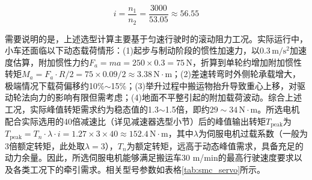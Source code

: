 {{{        \begin{equation}
        i = \frac{n_1}{n_2} = \frac{3000}{53.05} \approx 56.55
        \label{eq:4-2-8}
        \end{equation}

        需要说明的是，上述选型计算主要基于匀速行驶时的滚动阻力工况。实际运行中，小车还面临以下动态载荷情形：(1)起步与制动阶段的惯性加速力，以$0.3\,\mathrm{m/s^2}$加速度估算，附加惯性力约$F_a = ma = 250 \times 0.3 = 75\,\mathrm{N}$，折算到单轮约增加附加惯性转矩$M_a = F_a \cdot R / 2 = 75 \times 0.09 / 2 \approx 3.38 \, \mathrm{N\cdot m}$；(2)差速转弯时外侧轮承载增大，极端情况下载荷偏移约10\%$\sim$15\%；(3)举升过程中搬运物抬升导致重心上移，对驱动轮法向力的影响有限但需考虑；(4)地面不平整引起的附加载荷波动。综合上述工况，实际峰值转矩需求约为稳态值的1.3$\sim$1.5倍，即约$29\sim34\,\mathrm{N\cdot m}$。所选电机配合实际选用的40倍减速比（详见减速器选型小节）后的峰值输出转矩$T_{\text{peak}}$为$T_{\text{peak}} = T_n \cdot \lambda \cdot i = 1.27 \times 3 \times 40 \approx 152.4\,\mathrm{N\cdot m}$，其中$\lambda$为伺服电机过载系数（一般为3倍额定转矩，此处取$\lambda = 3$），$T_n$为额定转矩，远高于动态峰值需求，具备充足的动力余量。因此，所选伺服电机能够满足搬运车30 m/min的最高行驶速度要求以及各类工况下的牵引需求。相关型号参数如表格\ref{tab:smc_servo}所示。

}}}
